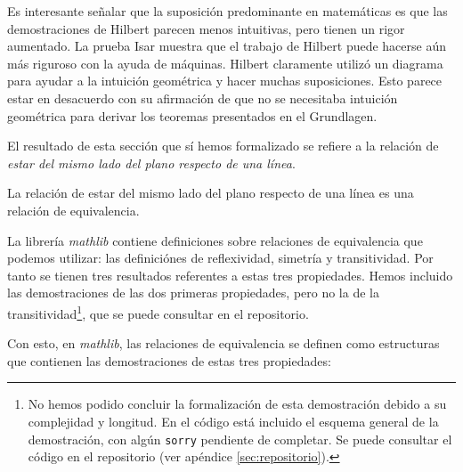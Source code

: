 \begin{displayquote}
	Es interesante señalar que la suposición predominante en matemáticas es que
	las demostraciones de Hilbert parecen menos intuitivas, pero tienen un rigor
	aumentado. La prueba Isar muestra que el trabajo de Hilbert puede hacerse
	aún más riguroso con la ayuda de máquinas. Hilbert claramente utilizó un
	diagrama para ayudar a la intuición geométrica y hacer muchas suposiciones.
	Esto parece estar en desacuerdo con su afirmación de que no se necesitaba
	intuición geométrica para derivar los teoremas presentados en el Grundlagen.
\end{displayquote}

El resultado de esta sección que sí hemos formalizado se refiere a la relación
de \textit{estar del mismo lado del plano respecto de una línea}.

\begin{prop}
	La relación de estar del mismo lado del plano respecto de una línea es una
	relación de equivalencia.
\end{prop}

La librería \textit{mathlib} contiene definiciones sobre relaciones de
equivalencia que podemos utilizar: las definiciónes de reflexividad, simetría y
transitividad. Por tanto se tienen tres resultados referentes a estas tres
propiedades. Hemos incluido las demostraciones de las dos primeras propiedades,
pero no la de la transitividad\footnote{No hemos podido concluir la
	formalización de esta demostración debido a su complejidad y longitud. En el
	código está incluido el esquema general de la demostración, con algún
	\lstinline{sorry} pendiente de completar. Se puede consultar el código en el
	repositorio (ver apéndice \ref{sec:repositorio}).}, que se puede consultar en el
repositorio.


Con esto, en \textit{mathlib}, las relaciones de equivalencia se definen como
estructuras que contienen las demostraciones de estas tres propiedades:






